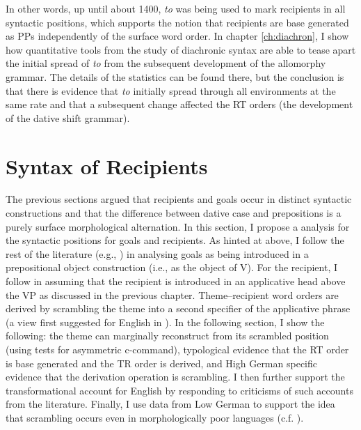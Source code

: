 In other words, up until about 1400, \textit{to} was being used to mark recipients in all syntactic positions, which supports the notion that recipients are base generated as PPs independently of the surface word order. In chapter \ref{ch:diachron}, I show how quantitative tools from the study of diachronic syntax are able to tease apart the initial spread of \textit{to} from the subsequent development of the allomorphy grammar. The details of the statistics can be found there, but the conclusion is that there is evidence that \textit{to} initially spread through all environments at the same rate and that a subsequent change affected the RT orders (the development of the dative shift grammar).

\section{Syntax of Recipients}\label{sec:synrecp}
The previous sections argued that recipients and goals occur in distinct syntactic constructions and that the difference between dative case and prepositions is a purely surface morphological alternation. In this section, I propose a analysis for the syntactic positions for goals and recipients. As hinted at above, I follow the rest of the literature (e.g., \citet{Jackendoff.1990,Harley.2002,Hallman.2015}) in analysing goals as being introduced in a prepositional object construction (i.e., as the object of V). For the recipient, I follow \cite{McGinnis.1998,Bruening.2010,Bruening.2010b} in assuming that the recipient is introduced in an applicative head above the VP as discussed in the previous chapter. Theme--recipient word orders are derived by scrambling the theme into a second specifier of the applicative phrase (a view first suggested for English in \citet{Takano.1998}). In the following section, I show the following: the theme can marginally reconstruct from its scrambled position (using tests for asymmetric c-command), typological evidence that the RT order is base generated and the TR order is derived, and High German specific evidence that the derivation operation is scrambling. I then further support the transformational account for English by responding to criticisms of such accounts from the literature. Finally, I use data from Low German to support the idea that scrambling occurs even in morphologically poor languages (c.f. \citealt{Weerman.1997}). 
